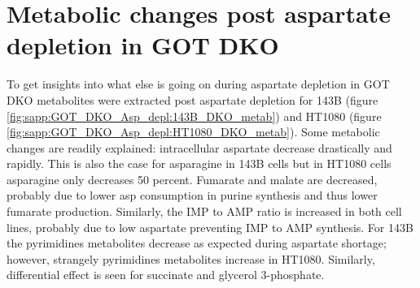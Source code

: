\FloatBarrier
\section{Metabolic changes post aspartate depletion in GOT DKO}
To get insights into what else is going on during aspartate depletion in GOT DKO metabolites were extracted post aspartate depletion for 143B (figure \ref{fig:sapp:GOT_DKO_Asp_depl:143B_DKO_metab}) and HT1080 (figure \ref{fig:sapp:GOT_DKO_Asp_depl:HT1080_DKO_metab}).
Some metabolic changes are readily explained: intracellular aspartate decrease drastically and rapidly.
This is also the case for asparagine in 143B cells but in HT1080 cells asparagine only decreases 50 percent.
Fumarate and malate are decreased, probably due to lower asp consumption in purine synthesis and thus lower fumarate production.
Similarly, the IMP to AMP ratio is increased in both cell lines, probably due to low aspartate preventing IMP to AMP synthesis.
For 143B the pyrimidines metabolites decrease as expected during aspartate shortage; however, strangely pyrimidines metabolites increase in HT1080.
Similarly, differential effect is seen for succinate and glycerol 3-phosphate.

